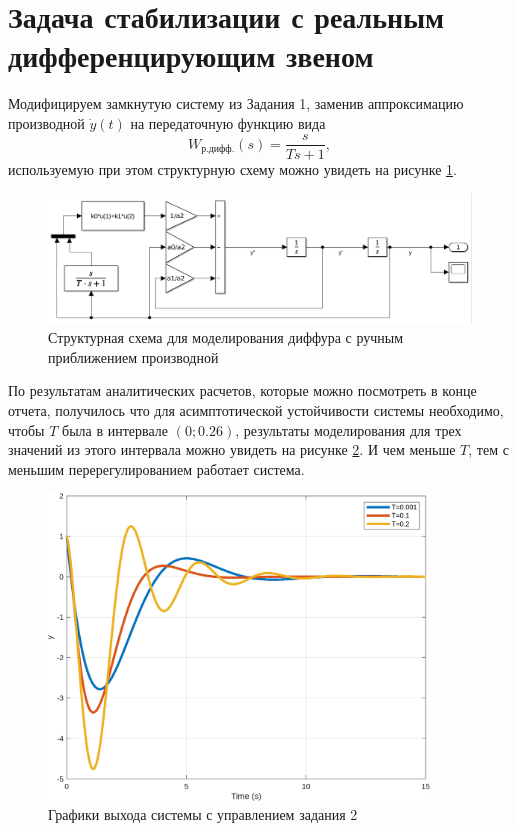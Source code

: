 \section{Задача стабилизации с реальным дифференцирующим звеном}

Модифицируем замкнутую систему из Задания 1, заменив аппроксимацию производной $\dot y(t)$
на передаточную функцию вида
\begin{equation*}
    W_{\text{р.дифф.}}(s)=\frac{s}{Ts+1},
\end{equation*}
используемую при этом структурную схему можно увидеть на рисунке \ref{fig:task_2_xls}.
\begin{figure}[H]
    \centering
    \includegraphics[width=1\textwidth]{figs/task_2_slx.png}
    \caption{Структурная схема для моделирования диффура с ручным приближением производной}
    \label{fig:task_2_xls}
\end{figure}
По результатам аналитических расчетов, которые можно посмотреть в конце
отчета, получилось что для асимптотической устойчивости
системы необходимо, чтобы $T$ была в интервале $(0;0.26)$, результаты 
моделирования для трех значений из этого интервала можно увидеть
на рисунке \ref{fig:task_2_out}. И чем меньше $T$, тем с меньшим
перерегулированием работает система. 
\begin{figure}[H]
    \centering
    \includegraphics[width=0.9\textwidth]{figs/task_2_out.png}
    \caption{Графики выхода системы с управлением задания 2}
    \label{fig:task_2_out}
\end{figure}



